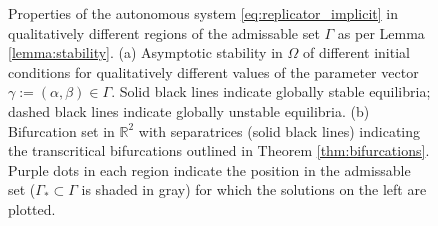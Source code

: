 \documentclass[../main.tex]{subfiles}
\begin{document}
\begin{figure}[H]
\begin{subfigure}[b]{0.495\textwidth}
        \caption{}
        \label{fig:autonomous_bifset}
    \end{subfigure}

    \caption{Properties of the autonomous system \eqref{eq:replicator_implicit} in qualitatively different regions of the admissable set $\Gamma$ as per Lemma \ref{lemma:stability}.
            (a) Asymptotic stability in $\Omega$ of different initial conditions for qualitatively different values of the parameter vector $\gamma:=(\alpha,\beta)\in\Gamma$. 
            Solid black lines indicate globally stable equilibria; dashed black lines indicate globally unstable equilibria. 
            (b) Bifurcation set in $\mathbb{R}^{2}$ with separatrices (solid black lines) indicating the transcritical bifurcations outlined in Theorem \ref{thm:bifurcations}.
            Purple dots in each region indicate the position in the admissable set ($\Gamma_{*}\subset\Gamma$ is shaded in gray) for which the solutions on the left are plotted.
    }
    \label{fig:autonomous}
\end{figure}

% 
%
\end{document}
